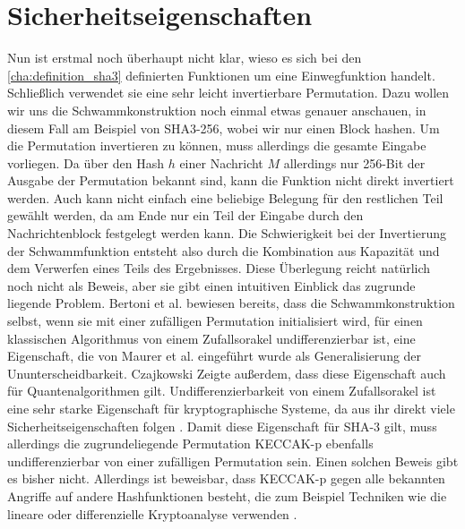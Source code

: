 \section{Sicherheitseigenschaften}
\label{cha:sha3_sicherheit}
Nun ist erstmal noch überhaupt nicht klar, wieso es sich bei den \ref{cha:definition_sha3} definierten Funktionen um eine Einwegfunktion handelt.
Schließlich verwendet sie eine sehr leicht invertierbare Permutation. Dazu wollen wir uns die Schwammkonstruktion noch einmal etwas genauer anschauen,
in diesem Fall am Beispiel von SHA3-256, wobei wir nur einen Block hashen. Um die Permutation invertieren zu können,
muss allerdings die gesamte Eingabe vorliegen. Da über den Hash $h$ einer Nachricht $M$ allerdings nur 256-Bit der Ausgabe der Permutation bekannt sind,
kann die Funktion nicht direkt invertiert werden. Auch kann nicht einfach eine beliebige Belegung für den restlichen Teil gewählt werden,
da am Ende nur ein Teil der Eingabe durch den Nachrichtenblock festgelegt werden kann. 
Die Schwierigkeit bei der Invertierung der Schwammfunktion entsteht also durch die Kombination aus Kapazität und dem Verwerfen eines Teils des Ergebnisses.
Diese Überlegung reicht natürlich noch nicht als Beweis, aber sie gibt einen intuitiven Einblick das zugrunde liegende Problem.
Bertoni et al. \cite{indifferentiability} bewiesen bereits, dass die Schwammkonstruktion selbst, wenn sie mit einer zufälligen Permutation initialisiert wird,
für einen klassischen Algorithmus von einem Zufallsorakel undifferenzierbar ist, eine Eigenschaft, die von Maurer et al. \cite{MaReHo04} eingeführt wurde als Generalisierung
der Ununterscheidbarkeit. Czajkowski \cite{quantum_indifferentiability} Zeigte außerdem, dass diese Eigenschaft auch für Quantenalgorithmen gilt. Undifferenzierbarkeit von einem Zufallsorakel
ist eine sehr starke Eigenschaft für kryptographische Systeme, da aus ihr direkt viele Sicherheitseigenschaften folgen \cite{indifferentiability}.
Damit diese Eigenschaft für SHA-3 gilt, muss allerdings die zugrundeliegende Permutation KECCAK-p ebenfalls undifferenzierbar von einer zufälligen Permutation sein.
Einen solchen Beweis gibt es bisher nicht. Allerdings ist beweisbar, dass KECCAK-p gegen alle bekannten Angriffe auf andere Hashfunktionen besteht, die zum Beispiel Techniken
wie die lineare oder differenzielle Kryptoanalyse verwenden \cite{Keccak11}.